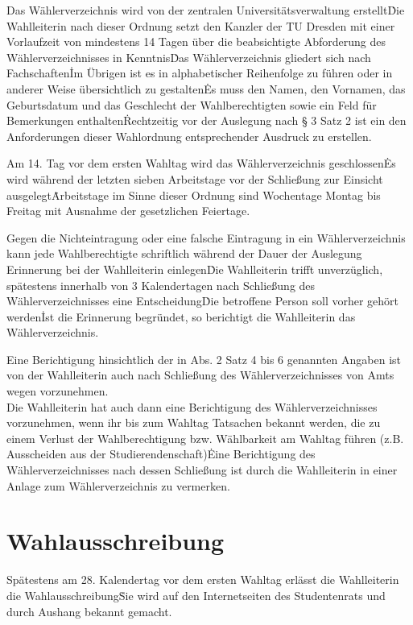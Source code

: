 \begin{multicols}{2}
\Abs \Satz Das Wählerverzeichnis wird von der zentralen Universitätsverwaltung erstellt\. Die Wahlleiterin nach dieser Ordnung setzt den Kanzler der TU Dresden mit einer Vorlaufzeit von mindestens 14 Tagen über die beabsichtigte Abforderung des Wählerverzeichnisses in Kenntnis\. Das Wählerverzeichnis gliedert sich nach Fachschaften\. Im Übrigen ist es in alphabetischer Reihenfolge zu führen oder in anderer Weise übersichtlich zu gestalten\. Es muss den Namen, den Vornamen, das Geburtsdatum und das Geschlecht der Wahlberechtigten sowie ein Feld für Bemerkungen enthalten\. Rechtzeitig vor der Auslegung nach § 3 Satz 2 ist ein den Anforderungen dieser Wahlordnung entsprechender Ausdruck zu erstellen.

\Abs \Satz Am 14. Tag vor dem ersten Wahltag wird das Wählerverzeichnis geschlossen\. Es wird während der letzten sieben Arbeitstage vor der Schließung zur Einsicht ausgelegt\. Arbeitstage im Sinne dieser Ordnung sind Wochentage Montag bis Freitag mit Ausnahme der gesetzlichen Feiertage.

\Abs \Satz Gegen die Nichteintragung oder eine falsche Eintragung in ein Wählerverzeichnis kann jede Wahlberechtigte schriftlich während der Dauer der Auslegung Erinnerung bei der Wahlleiterin einlegen\. Die Wahlleiterin trifft unverzüglich, spätestens innerhalb von 3 Kalendertagen nach Schließung des Wählerverzeichnisses eine Entscheidung\. Die betroffene Person soll vorher gehört werden\. Ist die Erinnerung begründet, so berichtigt die Wahlleiterin das Wählerverzeichnis.

\Abs \Satz Eine Berichtigung hinsichtlich der in Abs. 2 Satz 4 bis 6 genannten Angaben ist von der Wahlleiterin auch nach Schließung des Wählerverzeichnisses von Amts wegen vorzunehmen. \\
\Satz Die Wahlleiterin hat auch dann eine Berichtigung des Wählerverzeichnisses vorzunehmen, wenn ihr bis zum Wahltag Tatsachen bekannt werden, die zu einem Verlust der Wahlberechtigung bzw. Wählbarkeit am Wahltag führen (z.B. Ausscheiden aus der Studierendenschaft)\. Eine Berichtigung des Wählerverzeichnisses nach dessen Schließung ist durch die Wahlleiterin in einer Anlage zum Wählerverzeichnis zu vermerken.

\section{Wahlausschreibung}
\Abs \Satz Spätestens am 28. Kalendertag vor dem ersten Wahltag erlässt die Wahlleiterin die Wahlausschreibung\. Sie wird auf den Internetseiten des Studentenrats und durch Aushang bekannt gemacht.


\end{multicols}
